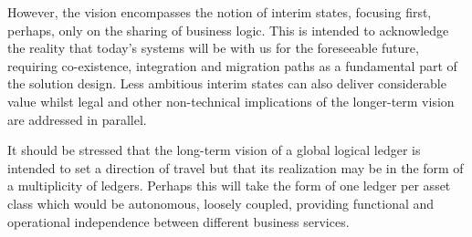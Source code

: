 \documentclass{article}
\begin{document}
However, the vision encompasses the notion of interim states, focusing first, perhaps, only on the sharing of business logic. This is intended to acknowledge the reality that today’s systems will be with us for the foreseeable future, requiring co-existence, integration and migration paths as a fundamental part of the solution design. Less ambitious interim states can also deliver considerable value whilst legal and other non-technical implications of the longer-term vision are addressed in parallel.

It should be stressed that the long-term vision of a global logical ledger is intended to set a direction of travel but that its realization may be in the form of a multiplicity of ledgers. Perhaps this will take the form of one ledger per asset class which would be autonomous, loosely coupled, providing functional and operational independence between different business services. 
\end{document}

